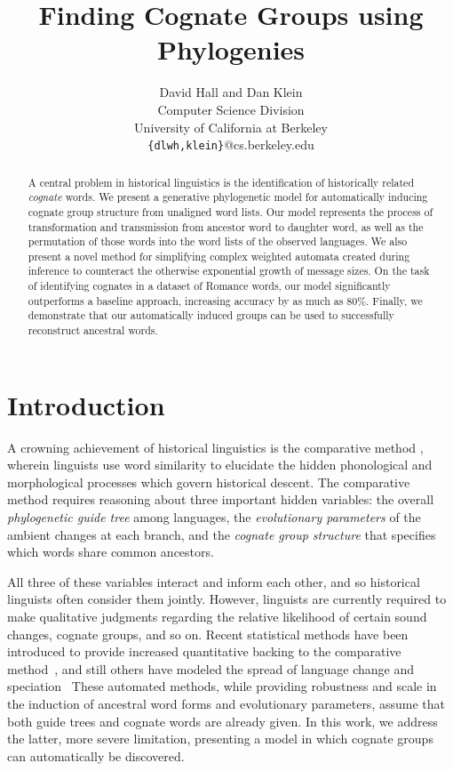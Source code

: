 \documentclass[11pt,a4paper]{article}
\title{Finding Cognate Groups using Phylogenies}
\author{David Hall and Dan Klein \\ Computer Science Division \\ University of California at Berkeley \\
\texttt{\{dlwh,klein\}}@cs.berkeley.edu}
\date{}
\begin{document}
\maketitle
\begin{abstract}
  A central problem in historical linguistics is the identification
  of historically related \emph{cognate} words.  We present a
  generative phylogenetic model for automatically inducing cognate
  group structure from unaligned word lists. Our model represents
  the process of transformation and transmission from ancestor word
  to daughter word, as well as the permutation of those words into
  the word lists of the observed languages. We also present a novel
  method for simplifying complex weighted automata created during
  inference to counteract the otherwise exponential growth of message
  sizes. On the task of identifying cognates in a dataset of Romance
  words, our model significantly outperforms a baseline approach,
  increasing accuracy by as much as 80\%. Finally, we demonstrate
  that our automatically induced groups can be used to successfully
  reconstruct ancestral words.
\end{abstract}
\section{Introduction}

A crowning achievement of historical linguistics is the comparative
method \cite{ohala93phonetics}, wherein linguists use word similarity
to elucidate the hidden phonological and morphological processes
which govern historical descent. The comparative method requires
reasoning about three important hidden variables: the overall
\emph{phylogenetic guide tree} among languages, the \emph{evolutionary
parameters} of the ambient changes at each branch, and the \emph{cognate
group structure} that specifies which words share common ancestors.

All three of these variables interact and inform each other, and
so historical linguists often consider them jointly.  However,
linguists are currently required to make qualitative judgments
regarding the relative likelihood of certain sound changes, cognate
groups, and so on.  Recent statistical methods have been introduced
to provide increased quantitative backing to the comparative
method~\cite{oakes00computer,bouchard07probabilistic,bouchard09improved},
and still others have modeled the spread of language
change and speciation~\cite{ringe02IE,daume07implication,daume09areal,nerbonne08measuring}
These automated methods, while providing robustness and scale in
the induction of ancestral word forms and evolutionary parameters,
assume that both guide trees and cognate words are already given.
In this work, we address the latter, more severe limitation,
presenting a model in which cognate groups can automatically be
discovered.
\end{document}
